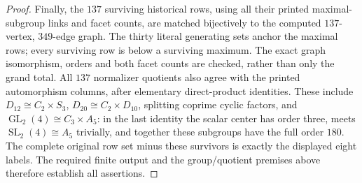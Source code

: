 \begin{proof}
Finally, the $137$ surviving historical rows, using all their printed maximal-subgroup links and facet counts, are matched bijectively to the computed $137$-vertex, $349$-edge graph. The thirty literal generating sets anchor the maximal rows; every surviving row is below a surviving maximum. The exact graph isomorphism, orders and both facet counts are checked, rather than only the grand total. All $137$ normalizer quotients also agree with the printed automorphism columns, after elementary direct-product identities. These include $D_{12}\cong C_2\times S_3$, $D_{20}\cong C_2\times D_{10}$, splitting coprime cyclic factors, and $\operatorname{GL}_2(4)\cong C_3\times A_5$: in the last identity the scalar center has order three, meets $\operatorname{SL}_2(4)\cong A_5$ trivially, and together these subgroups have the full order $180$. The complete original row set minus these survivors is exactly the displayed eight labels. The required finite output and the group/quotient premises above therefore establish all assertions.
\end{proof}

